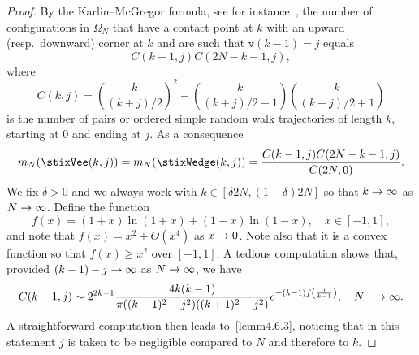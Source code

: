 \documentclass[AHL,Unicode,longabstracts]{cedram}
\newcommand{\Wedge}{\stixWedge}
\newcommand{\Vee}{\stixVee}
\theoremstyle{plain}
\newcommand{\ttv}{\mathtt{v}}
\let\originalleft\left
\let\originalright\right
\renewcommand{\left}{\mathopen{}\mathclose\bgroup\originalleft}
\renewcommand{\right}{\aftergroup\egroup\originalright}
\renewcommand*{\to}{\mathchoice{\longrightarrow}{\rightarrow}{\rightarrow}{\rightarrow}}
\begin{document}
\begin{proof}
By the Karlin--McGregor formula, see for instance~\cite[Theorem~2.5]{gorin2021lectures}, the number of configurations in $\Omega_N$ that have a contact point at $k$ with an upward (resp.~downward) corner at $k$ and are such that $\ttv(k-1)=j$ equals
\begin{equation}
C(k-1,j)C(2N-k-1,j),
\end{equation}
where
\begin{equation}
C(k,j)=\binom{k}{(k+j)/2}^2-\binom{k}{(k+j)/2-1}\binom{k}{(k+j)/2+1}
\end{equation}
is the number of pairs or ordered simple random walk trajectories of length $k$, starting at $0$ and ending at $j$. As a consequence
\begin{equation}\label{eq:KmG}
m_{N}(\Vee(k,j)) = m_{N}(\Wedge(k,j)) = \frac{C(k-1,j)C(2N-k-1,j)}{C(2N,0)}.
\end{equation}
We fix $\delta > 0$ and we always work with $k\in [\delta 2N, (1 - \delta) 2N]$ so that $k\to\infty$ as $N\to\infty$. Define the function
\[
f(x) = (1+x) \ln(1+x) + (1-x)\ln (1-x),\quad x\in [-1,1],
\]
and note that $f(x) = x^2 + O(x^4)$ as $x\to 0$. Note also that it is a convex function so that $f(x) \ge x^2$ over $[-1,1]$. A tedious computation shows that, provided $(k-1) - j \to \infty$ as $N\to\infty$, we have
\[
C(k-1,j) \sim 2^{2k-1} \frac{4k(k-1)}{\pi ((k-1)^2-j^2)((k+1)^2-j^2)} e^{-(k-1) f\left(\frac{j}{k-1}\right)},\quad N\to\infty.
\]
A straightforward computation then leads to~\eqref{lemm4.6.3}, noticing that in this statement $j$ is taken to be negligible compared to $N$ and therefore to $k$.


\end{proof}
\end{document}
